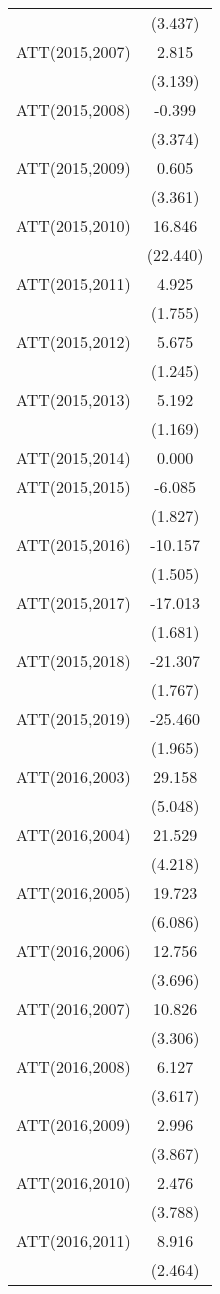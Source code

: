 \begin{table}
\begin{tabular}[t]{lc}
 & (3.437)\\
ATT(2015,2007) & 2.815\\
 & (3.139)\\
ATT(2015,2008) & -0.399\\
 & (3.374)\\
ATT(2015,2009) & 0.605\\
 & (3.361)\\
ATT(2015,2010) & 16.846\\
 & (22.440)\\
ATT(2015,2011) & 4.925\\
 & (1.755)\\
ATT(2015,2012) & 5.675\\
 & (1.245)\\
ATT(2015,2013) & 5.192\\
 & (1.169)\\
ATT(2015,2014) & 0.000\\
ATT(2015,2015) & -6.085\\
 & (1.827)\\
ATT(2015,2016) & -10.157\\
 & (1.505)\\
ATT(2015,2017) & -17.013\\
 & (1.681)\\
ATT(2015,2018) & -21.307\\
 & (1.767)\\
ATT(2015,2019) & -25.460\\
 & (1.965)\\
ATT(2016,2003) & 29.158\\
 & (5.048)\\
ATT(2016,2004) & 21.529\\
 & (4.218)\\
ATT(2016,2005) & 19.723\\
 & (6.086)\\
ATT(2016,2006) & 12.756\\
 & (3.696)\\
ATT(2016,2007) & 10.826\\
 & (3.306)\\
ATT(2016,2008) & 6.127\\
 & (3.617)\\
ATT(2016,2009) & 2.996\\
 & (3.867)\\
ATT(2016,2010) & 2.476\\
 & (3.788)\\
ATT(2016,2011) & 8.916\\
 & (2.464)\\

\end{tabular}
\end{table}
